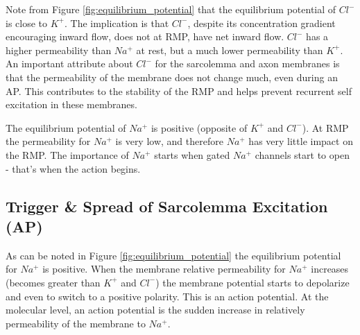 Note from Figure \ref{fig:equilibrium_potential} that the equilibrium potential of $Cl^-$ is close to $K^+$. The implication is that $Cl^-$, despite its concentration gradient encouraging inward flow, does not at RMP, have net inward flow. $Cl^-$ has a higher permeability than $Na^+$ at rest, but a much lower permeability than $K^+$. An important attribute about $Cl^-$ for the sarcolemma and axon membranes is that the permeability of the membrane does not change much, even during an AP. This contributes to the stability of the RMP and helps prevent recurrent self excitation in these membranes.

The equilibrium potential of $Na^+$ is positive (opposite of $K^+$ and $Cl^-$). At RMP the permeability for $Na^+$ is very low, and therefore $Na^+$ has very little impact on the RMP. The importance of $Na^+$ starts when gated $Na^+$ channels start to open - that's when the action begins.


\subsection{Trigger \& Spread of Sarcolemma Excitation (AP)}

As can be noted in Figure \ref{fig:equilibrium_potential} the equilibrium potential for $Na^+$ is positive. When the membrane relative permeability for $Na^+$ increases (becomes greater than $K^+$ and $Cl^-$) the membrane potential starts to depolarize and even to switch to a positive polarity. This is an action potential. At the molecular level, an action potential is the sudden increase in relatively permeability of the membrane to $Na^+$.  

